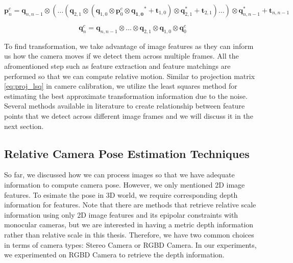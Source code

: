 \documentclass[a4paper]{report}
\numberwithin{figure}{section}
\begin{document}
\begin{equation}
  \mathbf{p}_{n}^c = 
  \mathbf{q}_{n, n-1} \otimes (\dots
  (\mathbf{q}_{2,1} \otimes
  (\mathbf{q}_{1,0} \otimes \mathbf{p}_0^c \otimes \mathbf{q_{1,0}}^* + \mathbf{t}_{1,0})
  \otimes \mathbf{q}_{2,1}^* + \mathbf{t}_{2,1})
  \dots) \otimes \mathbf{q}_{n, n-1}^* +\mathbf{t}_{n, n-1} 
\end{equation}

\begin{equation}
  \mathbf{q}_{n}^c = 
  \mathbf{q}_{n,n-1} \otimes \dots \otimes \mathbf{q}_{2,1} \otimes \mathbf{q}_{1,0} \otimes \mathbf{q}_{0}^c 
\end{equation}

To find transformation, we take advantage of image features as they can 
inform us how the camera moves if we detect them across multiple frames.
All the afromentioned step such as feature extraction and feature matchings 
are performed so that we 
can compute relative motion.
Similar to projection matrix \ref{eq:proj_lsq} in camere calibration, we utilize 
the least squares method for estimating the best approximate transformation information
due to the noise. Several methods available in literature to create 
relationship between feature points that we detect across different image frames and 
we will discuss it in the next section.

\subsection{Relative Camera Pose Estimation Techniques}
\label{sb_sc_relative_camera_pose_estimation_techniques}

So far, we discussed how we can process images so that we have adequate 
information to compute camera pose. However, we only mentioned 2D image 
features. To esimate the pose in 3D world, we require corresponding 
depth information for features. Note that there are methods that 
retrieve relative scale information using only 2D image features and its epipolar 
constraints with monocular cameras, 
but we are interested in having a metric depth information rather 
than relative scale in this thesis. Therefore, we have two common choices in terms 
of camera types: Stereo Camera or RGBD Camera. In our experiments, we experimented 
on RGBD Camera to retrieve the depth information.
\end{document}
